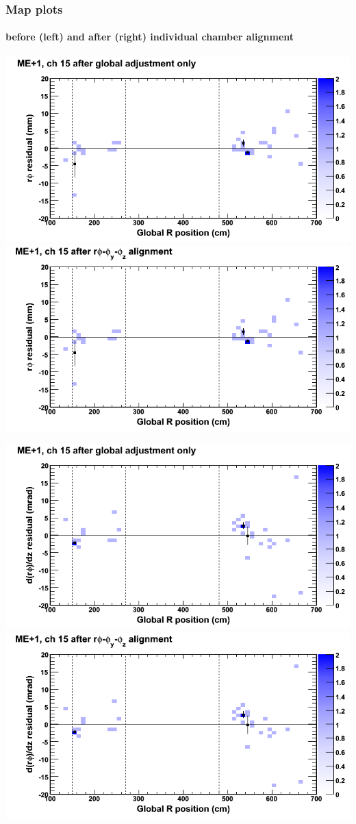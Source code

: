 \documentclass[compress]{beamer}
\begin{document}
\begin{frame}
\frametitle{Map plots}
\framesubtitle{before (left) and after (right) individual chamber alignment}
\includegraphics[width=0.5\linewidth]{ringmapplots_3dof/before_CSCvsr_mep1ch15_x.png} \includegraphics[width=0.5\linewidth]{ringmapplots_3dof/after_CSCvsr_mep1ch15_x.png}

\includegraphics[width=0.5\linewidth]{ringmapplots_3dof/before_CSCvsr_mep1ch15_dxdz.png} \includegraphics[width=0.5\linewidth]{ringmapplots_3dof/after_CSCvsr_mep1ch15_dxdz.png}
\end{frame}
\end{document}
